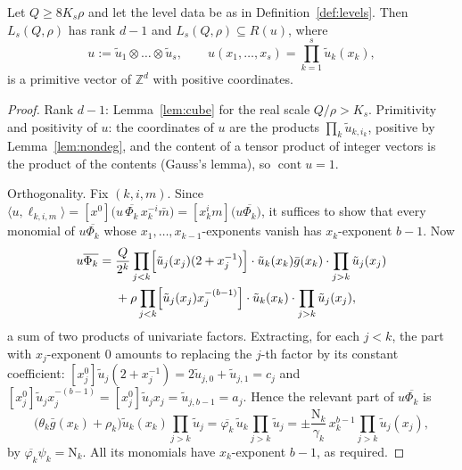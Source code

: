 \documentclass[12pt]{article}
\newcommand{\Z}{\mathbb{Z}}
\newcommand{\cont}{\operatorname{cont}}
\newcommand{\Nm}{\mathrm{N}}
\newcommand{\gpoly}{g}
\begin{document}
\begin{theorem}\label{thm:normal}
Let $Q\ge8K_s\rho$ and let the level data be as in Definition~\ref{def:levels}. Then $L_s(Q,\rho)$ has rank $d-1$ and
$L_s(Q,\rho)\subseteq R(u)$, where
\[
u:=\tilde u_1\otimes\dots\otimes\tilde u_s,\qquad u(x_1,\dots,x_s)=\prod_{k=1}^s\tilde u_k(x_k),
\]
is a primitive vector of $\Z^{d}$ with positive coordinates.
\end{theorem}
\begin{proof}
Rank $d-1$: Lemma~\ref{lem:cube} for the real scale $Q/\rho>K_s$. Primitivity and positivity of $u$: the coordinates of
$u$ are the products $\prod_k\tilde u_{k,i_k}$, positive by Lemma~\ref{lem:nondeg}, and the content of a tensor product
of integer vectors is the product of the contents (Gauss's lemma), so $\cont u=1$.

Orthogonality. Fix $(k,i,m)$. Since
$\langle u,\ell_{k,i,m}\rangle=[x^0]\bigl(u\,\overline{\Phi_k}\,x_k^{-i}\bar m\bigr)=[x_k^im]\bigl(u\overline{\Phi_k}\bigr)$,
it suffices to show that every monomial of $u\overline{\Phi_k}$ whose $x_1,\dots,x_{k-1}$-exponents vanish has
$x_k$-exponent $b-1$. Now
\begin{align*}
u\overline{\Phi_k}={}&\frac{Q}{2^k}\prod_{j<k}\Bigl[\tilde u_j(x_j)(2+x_j^{-1})\Bigr]\cdot\tilde u_k(x_k)\bar\gpoly(x_k)\cdot\prod_{j>k}\tilde u_j(x_j)\\
&+\rho\prod_{j<k}\Bigl[\tilde u_j(x_j)x_j^{-(b-1)}\Bigr]\cdot\tilde u_k(x_k)\cdot\prod_{j>k}\tilde u_j(x_j),
\end{align*}
a sum of two products of univariate factors. Extracting, for each $j<k$, the part with $x_j$-exponent $0$ amounts to
replacing the $j$-th factor by its constant coefficient: $[x_j^0]\tilde u_j(2+x_j^{-1})=2\tilde u_{j,0}+\tilde u_{j,1}=c_j$ and
$[x_j^0]\tilde u_jx_j^{-(b-1)}=[x_j^0]\tilde u_jx_j=\tilde u_{j,b-1}=a_j$. Hence the relevant part of $u\overline{\Phi_k}$ is
\[
\bigl(\theta_k\bar\gpoly(x_k)+\rho_k\bigr)\tilde u_k(x_k)\prod_{j>k}\tilde u_j
=\overline{\varphi_k}\,\tilde u_k\prod_{j>k}\tilde u_j
=\pm\frac{\Nm_k}{\gamma_k}\,x_k^{b-1}\prod_{j>k}\tilde u_j(x_j),
\]
by $\overline{\varphi_k}\psi_k=\Nm_k$. All its monomials have $x_k$-exponent $b-1$, as required.
\end{proof}
\end{document}
